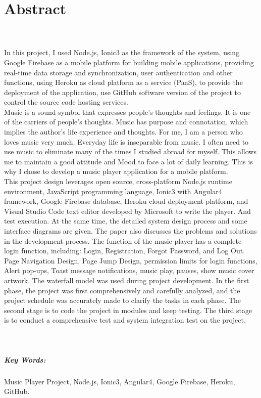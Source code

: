 
\chapter{Abstract}

\\ \\ In this project, I used Node.js, Ionic3 as the framework of the system, using Google Firebase as a mobile platform for building mobile applications, providing real-time data storage and synchronization, user authentication and other functions, using Heroku as cloud platform as a service (PaaS), to provide the deployment of the application, use GitHub software version of the project to control the source code hosting services.
\\ Music is a sound symbol that expresses people's thoughts and feelings. It is one of the carriers of people's thoughts. Music has purpose and connotation, which implies the author's life experience and thoughts. For me, I am a person who loves music very much. Everyday life is inseparable from music. I often need to use music to eliminate many of the times I studied abroad for myself. This allows me to maintain a good attitude and Mood to face a lot of daily learning. This is why I chose to develop a music player application for a mobile platform.
\\ This project design leverages open source, cross-platform Node.js runtime environment, JavaScript programming language, Ionic3 with Angular4 framework, Google Firebase database, Heroku cloud deployment platform, and Visual Studio Code text editor developed by Microsoft to write the player. And test execution.
At the same time, the detailed system design process and some interface diagrams are given. The paper also discusses the problems and solutions in the development process. The function of the music player has a complete login function, including: Login, Registration, Forgot Password, and Log Out. Page Navigation Design, Page Jump Design, permission limits for login functions, Alert pop-ups, Toast message notifications, music play, pauses, show music cover artwork.  The waterfall model was used during project development. In the first phase, the project was first comprehensively and carefully analyzed, and the project schedule was accurately made to clarify the tasks in each phase. The second stage is to code the project in modules and keep testing. The third stage is to conduct a comprehensive test and system integration test on the project.
\\ \\ \\ \paragraph{Key Words:} Music Player Project,  Node.js,  Ionic3,  Angular4,  Google Firebase,  Heroku,  GitHub.
